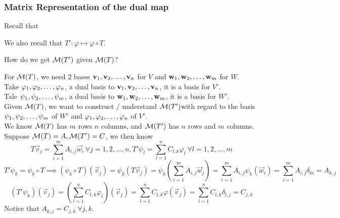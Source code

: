 \subsubsection{Matrix Representation of the dual map}
Recall that
\begin{center}
\end{center}
\begin{center}
\end{center}
We also recall that $T' : \varphi \mapsto \varphi \circ T$.
\newpage
\begin{question}
    How do we get $\mathcal M(T')$ given $\mathcal M(T)$?
\end{question}
\begin{answer}
For $\mathcal M(T)$, we need $2$ bases ${\mathbf v}_1,{\mathbf v}_2, \ldots, {\mathbf v}_{n}$ for $V$ and ${\mathbf w}_1,{\mathbf w}_2, \ldots, {\mathbf w}_{m}$ for $W$. \\
    Take ${\varphi}_1,{\varphi}_2, \ldots, {\varphi}_{n}$, a dual basis to ${\mathbf v}_1,{\mathbf v}_2, \ldots, {\mathbf v}_{n}$, it is a basis for $V'$. \\
    Tale ${\psi}_1,{\psi}_2, \ldots, {\psi}_{m}$, a dual basis to ${\mathbf w}_1,{\mathbf w}_2, \ldots, {\mathbf w}_{m}$, it is a basis for $W'$. \\
    Given $\mathcal M(T)$, we want to construct / understand $\mathcal M(T')$with regard to the basis ${\psi}_1,{\psi}_2, \ldots, {\psi}_{m}$ of $W'$ and ${\varphi}_1,{\varphi}_2, \ldots, {\varphi}_{n}$ of $V'$. \\
    We know $\mathcal M(T)$ has $m$ rows $n$ columns, and $\mathcal M(T')$ has $n$ rows and $m$ columns. \\Suppose $\mathcal M(T) = A, \mathcal M(T') = C$, we then know 
    \[ T\vec v_j = \sum_{i = 1}^m A_{i,j} \vec w_i \ \forall j = 1,2, \ldots, n, T'\psi_l = \sum_{l = 1}^n C_{l,k} \varphi_{l} \ \forall l =  1,2,\ldots, m\]
    \[ T' \psi_k = \psi_k \circ T \implies (\psi_k \circ T )(\vec v_j) = \psi_k(T\vec v_j) = \psi_k \left( \sum_{i=1}^m A_{i,j} \vec w_j \right) = \sum_{i = 1}^m A_{i,j} \psi_k(\vec w_i) = \sum_{i = 1}^m A_{i,j} \delta_{ki} = A_{k,j}\]
    \[(T'\psi_k)(\vec v_j) = \left( \sum_{l = 1}^{n} C_{l,k} \varphi_l \right) (\vec v_j) = \sum_{l = 1}^{n} C_{l,k} \varphi(\vec v_j) = \sum_{l = 1}^{n} C_{l,k} \delta_{l,j} = C_{j,k} \]
    Notice that $A_{k,j} = C_{j,k} \ \forall j,k$.
\end{answer}
